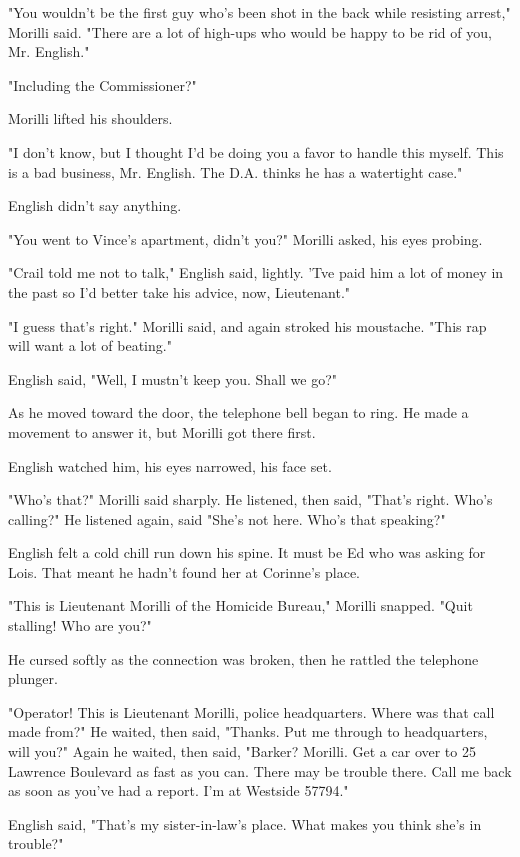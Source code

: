 \documentclass{novel}
\begin{document}
"You wouldn't be the first guy who's been shot in the back while resisting arrest," Morilli said. "There are a lot of high-ups who would be happy to be rid of you, Mr. English."

"Including the Commissioner?"

Morilli lifted his shoulders.

"I don't know, but I thought I'd be doing you a favor to handle this myself. This is a bad business, Mr. English. The D.A. thinks he has a watertight case."

English didn't say anything.

"You went to Vince's apartment, didn't you?" Morilli asked, his eyes probing.

"Crail told me not to talk," English said, lightly. 'Tve paid him a lot of money in the past so I'd better take his advice, now, Lieutenant."

"I guess that's right." Morilli said, and again stroked his moustache. "This rap will want a lot of beating."

English said, "Well, I mustn't keep you. Shall we go?"

As he moved toward the door, the telephone bell began to ring. He made a movement to answer it, but Morilli got there first.

English watched him, his eyes narrowed, his face set.

"Who's that?" Morilli said sharply. He listened, then said, "That's right. Who's calling?" He listened again, said "She's not here. Who's that speaking?"

English felt a cold chill run down his spine. It must be Ed who was asking for Lois. That meant he hadn't found her at Corinne's place.

"This is Lieutenant Morilli of the Homicide Bureau," Morilli snapped. "Quit stalling! Who are you?"

He cursed softly as the connection was broken, then he rattled the telephone plunger.

"Operator! This is Lieutenant Morilli, police headquarters. Where was that call made from?" He waited, then said, "Thanks. Put me through to headquarters, will you?" Again he waited, then said, "Barker? Morilli. Get a car over to 25 Lawrence Boulevard as fast as you can. There may be trouble there. Call me back as soon as you've had a report. I'm at Westside 57794."

English said, "That's my sister-in-law's place. What makes you think she's in trouble?"
\end{document}
